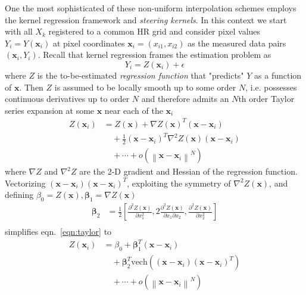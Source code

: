 One the most sophisticated of these non-uniform interpolation schemes employs the kernel regression framework and \textit{steering kernels}\cite{Takeda2007}.
%
In this context we start with all $X_k$ registered to a common HR grid and consider pixel values $Y_i = Y(\bm{x}_i)$ at pixel coordinates $\bm{x}_i = (x_{i1},x_{i2})$ as the measured data pairs $(\bm{x}_i, Y_i)$.
%
Recall that kernel regression frames the estimation problem as
\begin{equation}
    Y_i = Z(\bm{x}_i) + \epsilon
\end{equation}
where $Z$ is the to-be-estimated \textit{regression function} that "predicts" $Y$ as a function of $\bm{x}$.
%
Then $Z$ is assumed to be locally smooth up to some order $N$, i.e. possesses continuous derivatives up to order $N$ and therefore admits an $N$th order Taylor series expansion at some $\bm{x}$ near each of the $\bm{x}_i$
\newcommand*{\bx}{\bm{x}}
\newcommand*{\bxi}{\bm{x}_i}
\newcommand*{\delx}{\bx - \bxi}
\newcommand*{\zbx}{Z(\bx)}
\newcommand*{\zbxi}{Z(\bxi)}
\newcommand*{\bb}{\bm{\beta}}
\newcommand*{\hzbx}{\hat{Z}(\bx)}
\begin{equation}
    \label{eqn:taylor}
    \begin{split}
        \zbxi &= \zbx + \nabla \zbx^T(\delx)\\
        & \quad + \frac{1}{2}(\delx)^T \nabla^2 \zbx (\delx) \\
        & \quad + \cdots + o\left(\left\| \delx \right\|^N \right)
    \end{split}
\end{equation}
where $\nabla Z$ and $\nabla^2 Z$ are the 2-D gradient and Hessian of the regression function.
%
Vectorizing $(\delx)(\delx)^T$, exploiting the symmetry of $\nabla^2 \zbx$, and defining
$\beta_0 = \zbx, \bb_1 = \nabla \zbx$
\begin{align*}
    \bb_2 &= \frac{1}{2}\left[ \frac{\partial^2 \zbx}{\partial x_1^2}, 2 \frac{\partial^2 \zbx}{\partial x_1 \partial x_2}, \frac{\partial^2 \zbx}{\partial x_2^2} \right] \\
\end{align*}
simplifies eqn.~\ref{eqn:taylor} to
\begin{equation}
    \label{eqn:betataylor}
    \begin{split}
        \zbxi &= \beta_0 + \bb_1^T (\delx) \\
        &\quad + \bb_2^T \text{vech}\left( (\delx) (\delx)^T \right) \\
        &\quad + \cdots + o\left(\left\| \delx \right\|^N \right)
    \end{split}
\end{equation}

